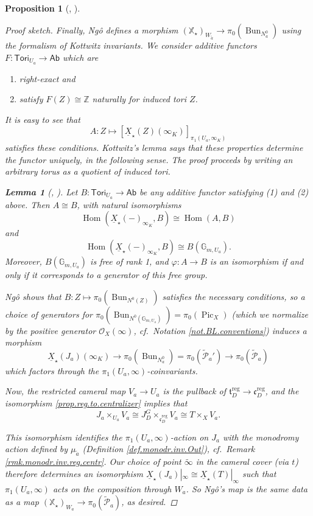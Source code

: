 \documentclass[openany]{amsbook}
\newtheorem{lemma}[theorem]{Lemma}
\newtheorem{proposition}[theorem]{Proposition}
\theoremstyle{definition}
\theoremstyle{remark}
\numberwithin{equation}{section}
\newcommand{\Z}{\mathbb{Z}}
\newcommand{\G}{\mathbb{G}}
\renewcommand{\O}{\mathcal{O}}
\newcommand{\cP}{\mathcal{P}}
\newcommand{\ul}[1]{\underline{#1}}
\renewcommand{\phi}{\varphi}
\renewcommand{\-}{\operatorname{-}}
\newcommand{\Hom}{\operatorname{Hom}}
\newcommand{\Ab}{\mathsf{Ab}}
\newcommand{\Pic}{\operatorname{Pic}}
\newcommand{\on}[1]{\operatorname{#1}}
\newcommand{\wtilde}[1]{\widetilde{#1}}
\newcommand{\reg}{\on{reg}}
\newcommand{\ctP}{\widetilde{\cP}}
\newcommand{\bX}{\mathbb{X}}
\newcommand{\ft}{\mathfrak{t}}
\newcommand{\fc}{\mathfrak{c}}
\newcommand{\Bun}{\on{Bun}}
\begin{document}
\begin{proposition}[{{\cite[\S 5.5]{ngofl}, \cite[6.3-6.7]{ngoendo}}}]
\begin{proof}[Proof sketch]
        Finally, Ng\^{o} defines a morphism $(\bX_\star)_{W_{\wtilde{a}}} \to \pi_0(\Bun_{N_a^0})$ using the formalism of Kottwitz invariants. We consider additive functors $F : \mathsf{Tori}_{U_a} \to \Ab$ which are
        \begin{enumerate}
            \item right-exact and
            \item satisfy $F(Z) \cong \Z$ naturally for induced tori $Z$.
        \end{enumerate}
        It is easy to see that $$A : Z \mapsto [\ul{X}_\star(Z)(\infty_K)]_{\pi_1(U_a, \infty_K)}$$
        satisfies these conditions. Kottwitz's lemma says that these properties determine the functor uniquely, in the following sense. The proof proceeds by writing an arbitrary torus as a quotient of induced tori.

        \begin{lemma}[{\cite[2.2]{kottwitzisocrystals}, \cite[6.5]{ngoendo}}]\label{lem.kottwitz.lemma}
            Let $B : \mathsf{Tori}_{U_a} \to \Ab$ be any additive functor satisfying (1) and (2) above. Then $A \cong B$, with natural isomorphisms
            $$
            \Hom(\ul{X}_\star(-)_{\infty_K}, B) \cong \Hom(A, B)
            $$
            and 
            $$
                \Hom(\ul{X}_\star(-)_{\infty_K}, B) \cong B(\G_{m, U_a}).
            $$
            Moreover, $B(\G_{m, U_a})$ is free of rank 1, and $\phi : A \to B$ is an isomorphism if and only if it corresponds to a generator of this free group. 
        \end{lemma}
        
        Ng\^{o} shows that $B : Z \mapsto \pi_0(\Bun_{N^0(Z)})$ satisfies the necessary conditions, so a choice of generators for $\pi_0(\Bun_{N^0(\G_{m, U_a})}) = \pi_0(\Pic_X)$ (which we normalize by the positive generator $\O_X(\infty)$, cf.\ Notation \ref{not.BL.conventions}) induces a morphism $$\ul{X}_\star(J_a)(\infty_K) \to \pi_0(\Bun_{N^0_a}) = \pi_0(\ctP_a') \to \pi_0(\ctP_a)$$ which factors through the $\pi_1(U_a, \infty)$-coinvariants. 
        
        Now, the restricted cameral map $V_a \to U_a$ is the pullback of $\ft^{\reg}_D \to \fc^{\reg}_D$, and the isomorphism \ref{prop.reg.to.centralizer} implies that 
        $$J_a \times_{U_a} V_a \cong J_{D}^G \times_{\fc^{\reg}_D} V_a \cong T \times_X V_a.$$

        This isomorphism identifies the $\pi_1(U_a, \infty)$-action on $J_a$ with the monodromy action defined by $\mu_{\wtilde{a}}$ (Definition \ref{def.monodr.inv.Out}), cf.\ Remark \ref{rmk.monodr.inv.reg.centr}. Our choice of point $\wtilde{\infty}$ in the cameral cover (via $t$) therefore determines an isomorphism $\ul{X}_\star(J_a)|_\infty \cong \ul{X}_\star(T)|_\infty$ such that $\pi_1(U_a, \infty)$ acts on the composition through $W_a$. So Ng\^{o}'s map is the same data as a map $(\bX_\star)_{W_a} \to \pi_0(\ctP_a)$, as desired.
    \end{proof}
\end{proposition}
\end{document}
